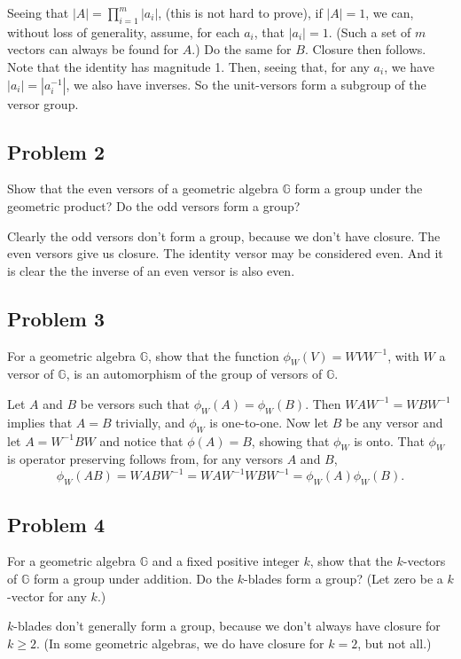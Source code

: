 \documentclass[12pt]{article}
\newcommand{\G}{\mathbb{G}}
\begin{document}
Seeing that $|A|=\prod_{i=1}^m |a_i|$, (this is not hard to prove), if $|A|=1$, we can, without loss
of generality, assume, for each $a_i$, that $|a_i|=1$.  (Such a set of $m$
vectors can always be found for $A$.)  Do the same for $B$.  Closure then follows.  Note that the identity
has magnitude 1.  Then, seeing that, for any $a_i$, we have $|a_i|=|a_i^{-1}|$,
we also have inverses.  So the unit-versors form a subgroup of the versor group.

\subsection*{Problem 2}

Show that the even versors of a geometric algebra $\G$
form a group under the geometric product?  Do the odd versors form a group?

Clearly the odd versors don't form a group, because we don't have closure.
The even versors give us closure.  The identity versor may be considered even.
And it is clear the the inverse of an even versor is also even.

\subsection*{Problem 3}

For a geometric algebra $\G$, show that
the function $\phi_W(V)=WVW^{-1}$, with $W$ a versor of $\G$,
is an automorphism of the group of versors of $\G$.

Let $A$ and $B$ be versors such that $\phi_W(A)=\phi_W(B)$.
Then $WAW^{-1}=WBW^{-1}$ implies that $A=B$ trivially, and
$\phi_W$ is one-to-one.  Now let $B$ be any versor and
let $A=W^{-1}BW$ and notice that $\phi(A)=B$, showing that
$\phi_W$ is onto.  That $\phi_W$ is operator preserving follows
from, for any versors $A$ and $B$,
\begin{equation*}
\phi_W(AB)=WABW^{-1}=WAW^{-1}WBW^{-1}=\phi_W(A)\phi_W(B).
\end{equation*}

\subsection*{Problem 4}

For a geometric algebra $\G$ and a fixed positive integer $k$, show that the $k$-vectors of $\G$
form a group under addition.  Do the $k$-blades form a group?  (Let zero be a $k$-vector for any $k$.)

$k$-blades don't generally form a group, because we don't always have closure for $k\geq 2$.
(In some geometric algebras, we do have closure for $k=2$, but not all.)
\end{document}
